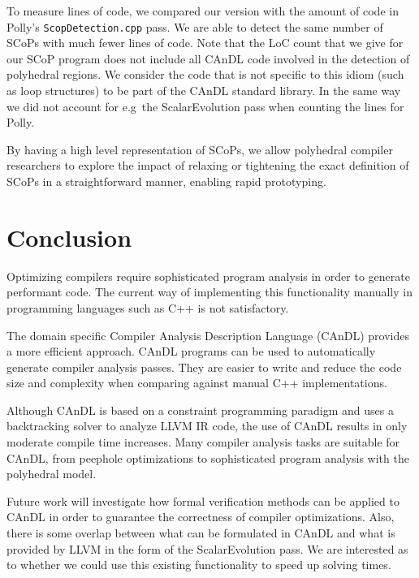     To measure lines of code, we compared our version with the amount of code in
    Polly's \texttt{ScopDetection.cpp} pass.
    We are able to detect the same number of SCoPs with much fewer lines of
    code.
    Note that the LoC count that we give for our SCoP program does not include
    all CAnDL code involved in the detection of polyhedral regions.
    We consider the code that is not specific to this idiom (such as loop
    structures) to be part of the CAnDL standard library.
    In the same way we did not account for e.g\ the ScalarEvolution pass when
    counting the lines for Polly.

    By having a high level representation of SCoPs, we allow polyhedral compiler
    researchers to explore the impact of relaxing or tightening the exact
    definition of SCoPs in a straightforward manner, enabling rapid prototyping.

\begin{figure}[ht]
    
    \label{fig:candlvspolly}
\end{figure}

\section{Conclusion}

    Optimizing compilers require sophisticated program analysis in order to
    generate performant code.
    The current way of implementing this functionality manually in programming
    languages such as C++ is not satisfactory.

    The domain specific Compiler Analysis Description Language (CAnDL) provides
    a more efficient approach.
    CAnDL programs can be used to automatically generate compiler analysis
    passes.
    They are easier to write and reduce the code size and complexity when
    comparing against manual C++ implementations.

    Although CAnDL is based on a constraint programming paradigm and uses a
    backtracking solver to analyze LLVM IR code, the use of CAnDL results in
    only moderate compile time increases.
    Many compiler analysis tasks are suitable for CAnDL, from
    peephole optimizations to sophisticated program analysis with the polyhedral
    model.

    Future work will investigate how formal verification methods can be
    applied to CAnDL in order to guarantee the correctness of compiler
    optimizations.
    Also, there is some overlap between what can be formulated in CAnDL and what
    is provided by LLVM in the form of the ScalarEvolution pass.
    We are interested as to whether we could use this existing functionality to
    speed up solving times.
